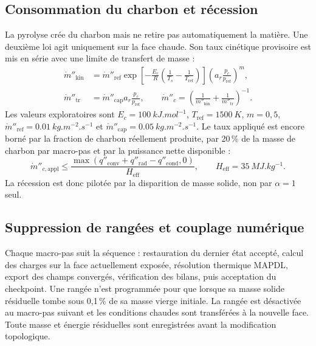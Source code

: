 \documentclass[oneside,openany]{amsdtx}
\begin{document}
\subsection{Consommation du charbon et récession}
La pyrolyse crée du charbon mais ne retire pas automatiquement la matière. Une
deuxième loi agit uniquement sur la face chaude. Son taux cinétique provisoire
est mis en série avec une limite de transfert de masse :
\begin{align}
 \dot m''_{\mathrm{kin}}&=\dot m''_{\mathrm{ref}}
 \exp\!\left[-\frac{E_c}{R}\left(\frac1{T_s}-\frac1{T_{\mathrm{ref}}}\right)\right]
 \left(a_r\frac{p_c}{p_{\mathrm{ref}}}\right)^{m},\\
 \dot m''_{\mathrm{tr}}&=\dot m''_{\mathrm{cap}}
 a_r\frac{p_c}{p_{\mathrm{ref}}},\qquad
 \dot m''_c=\left(\frac1{\dot m''_{\mathrm{kin}}}
 +\frac1{\dot m''_{\mathrm{tr}}}\right)^{-1}.
 \label{eq:v0-char}
\end{align}
Les valeurs exploratoires sont \(E_c=\SI{100}{kJ.mol^{-1}}\),
\(T_{\mathrm{ref}}=\SI{1500}{K}\), \(m=0{,}5\),
\(\dot m''_{\mathrm{ref}}=\SI{0.01}{kg.m^{-2}.s^{-1}}\) et
\(\dot m''_{\mathrm{cap}}=\SI{0.05}{kg.m^{-2}.s^{-1}}\). Le taux appliqué est
encore borné par la fraction de charbon réellement produite, par 20\,\% de la
masse de charbon par macro-pas et par la puissance nette disponible :
\begin{equation}
 \dot m''_{c,\mathrm{appl}}\leq
 \frac{\max(q''_{\mathrm{conv}}+q''_{\mathrm{rad}}-q''_{\mathrm{cond}},0)}
 {H_{\mathrm{eff}}},\qquad H_{\mathrm{eff}}=\SI{35}{MJ.kg^{-1}}.
 \label{eq:v0-energy-cap}
\end{equation}
La récession est donc pilotée par la disparition de masse solide, non par
\(\alpha=1\) seul.

\subsection{Suppression de rangées et couplage numérique}
Chaque macro-pas suit la séquence : restauration du dernier état accepté,
calcul des charges sur la face actuellement exposée, résolution thermique
MAPDL, export des champs convergés, vérification des bilans, puis acceptation du
checkpoint. Une rangée n'est programmée pour  que lorsque sa masse
solide résiduelle tombe sous 0,1\,\% de sa masse vierge initiale. La rangée est
désactivée au macro-pas suivant et les conditions chaudes sont transférées à la
nouvelle face. Toute masse et énergie résiduelles sont enregistrées avant la
modification topologique.
\end{document}

